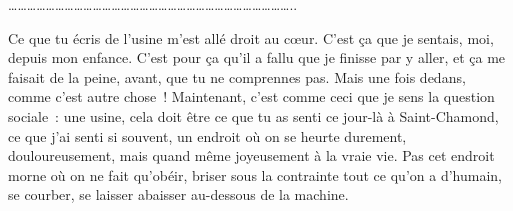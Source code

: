 \documentclass[french,twoside]{book} %
\begin{document}
\begin{center}
………………………………………………………………………………..\end{center}
\noindent Ce que tu écris de l'usine m'est allé droit au cœur. C'est ça que je sentais, moi, depuis mon enfance. C'est pour ça qu'il a fallu que je finisse par y aller, et ça me faisait de la peine, avant, que tu ne comprennes pas. Mais une fois dedans, comme c'est autre chose ! Maintenant, c'est comme ceci que je sens la question sociale : une usine, cela doit être ce que tu as senti ce jour-là à Saint-Chamond, ce que j'ai senti si souvent, un endroit où on se heurte durement, douloureusement, mais quand même joyeusement à la vraie vie. Pas cet endroit morne où on ne fait qu'obéir, briser sous la contrainte tout ce qu'on a d'humain, se courber, se laisser abaisser au-dessous de la machine.\par
\end{document}
